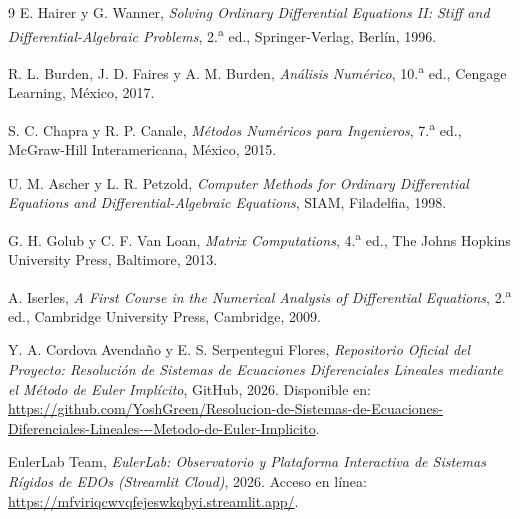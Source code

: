 \documentclass[11pt,a4paper]{article}
\begin{document}
\begin{thebibliography}{9}
    E. Hairer y G. Wanner, \textit{Solving Ordinary Differential Equations II: Stiff and Differential-Algebraic Problems}, 2.\textsuperscript{a} ed., Springer-Verlag, Berlín, 1996.
    
    R. L. Burden, J. D. Faires y A. M. Burden, \textit{Análisis Numérico}, 10.\textsuperscript{a} ed., Cengage Learning, México, 2017.
    
    S. C. Chapra y R. P. Canale, \textit{Métodos Numéricos para Ingenieros}, 7.\textsuperscript{a} ed., McGraw-Hill Interamericana, México, 2015.
    
    U. M. Ascher y L. R. Petzold, \textit{Computer Methods for Ordinary Differential Equations and Differential-Algebraic Equations}, SIAM, Filadelfia, 1998.
    
    G. H. Golub y C. F. Van Loan, \textit{Matrix Computations}, 4.\textsuperscript{a} ed., The Johns Hopkins University Press, Baltimore, 2013.
    
    A. Iserles, \textit{A First Course in the Numerical Analysis of Differential Equations}, 2.\textsuperscript{a} ed., Cambridge University Press, Cambridge, 2009.

    Y. A. Cordova Avendaño y E. S. Serpentegui Flores, \textit{Repositorio Oficial del Proyecto: Resolución de Sistemas de Ecuaciones Diferenciales Lineales mediante el Método de Euler Implícito}, GitHub, 2026. Disponible en: \url{https://github.com/YoshGreen/Resolucion-de-Sistemas-de-Ecuaciones-Diferenciales-Lineales---Metodo-de-Euler-Implicito}.

    EulerLab Team, \textit{EulerLab: Observatorio y Plataforma Interactiva de Sistemas Rígidos de EDOs (Streamlit Cloud)}, 2026. Acceso en línea: \url{https://mfviriqcwvqfejeswkqbyi.streamlit.app/}.
\end{thebibliography}
\end{document}
